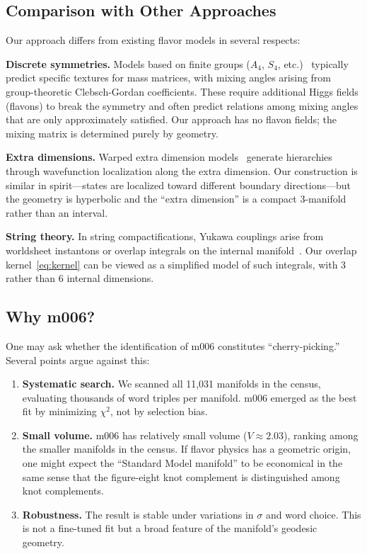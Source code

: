\documentclass[11pt,a4paper]{article}
\begin{document}
\subsection{Comparison with Other Approaches}
\label{subsec:comparison_other}

Our approach differs from existing flavor models in several respects:

\textbf{Discrete symmetries.} Models based on finite groups 
($A_4$, $S_4$, etc.)~\cite{AltarelliFeruglio2010} typically predict 
specific textures for mass matrices, with mixing angles arising from 
group-theoretic Clebsch-Gordan coefficients. These require additional 
Higgs fields (flavons) to break the symmetry and often predict 
relations among mixing angles that are only approximately satisfied. 
Our approach has no flavon fields; the mixing matrix is determined 
purely by geometry.

\textbf{Extra dimensions.} Warped extra dimension 
models~\cite{Randall1999} generate hierarchies through wavefunction 
localization along the extra dimension. Our construction is similar 
in spirit---states are localized toward different boundary 
directions---but the geometry is hyperbolic and the ``extra dimension'' 
is a compact 3-manifold rather than an interval.

\textbf{String theory.} In string compactifications, Yukawa couplings 
arise from worldsheet instantons or overlap integrals on the internal 
manifold~\cite{Ibanez2012}. Our overlap kernel~\eqref{eq:kernel} can 
be viewed as a simplified model of such integrals, with 3 rather than 
6 internal dimensions.

\subsection{Why m006?}
\label{subsec:why_m006}

One may ask whether the identification of m006 constitutes 
``cherry-picking.'' Several points argue against this:

\begin{enumerate}
\item \textbf{Systematic search.} We scanned all 11,031 manifolds in 
the census, evaluating thousands of word triples per manifold. m006 
emerged as the best fit by minimizing $\chi^2$, not by selection bias.

\item \textbf{Small volume.} m006 has relatively small volume 
($V \approx 2.03$), ranking among the smaller manifolds in the census. 
If flavor physics has a geometric origin, one might expect the 
``Standard Model manifold'' to be economical in the same sense that 
the figure-eight knot complement is distinguished among knot complements.

\item \textbf{Robustness.} The result is stable under variations in 
$\sigma$ and word choice. This is not a fine-tuned fit but a broad 
feature of the manifold's geodesic geometry.
\end{enumerate}
\end{document}
